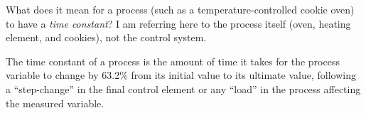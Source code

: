 

What does it mean for a process (such as a temperature-controlled cookie oven) to have a {\it time constant}?  I am referring here to the process itself (oven, heating element, and cookies), not the control system.







The time constant of a process is the amount of time it takes for the process variable to change by 63.2\% from its initial value to its ultimate value, following a ``step-change'' in the final control element or any ``load'' in the process affecting the measured variable.













